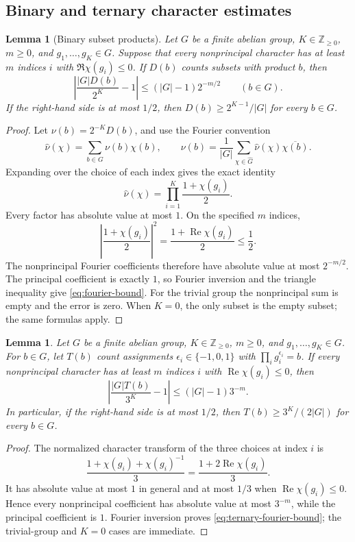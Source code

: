 \documentclass[11pt]{article}
\newtheorem{lemma}[theorem]{Lemma}
\theoremstyle{remark}\newtheorem{remark}[theorem]{Remark}
\begin{document}
\subsection{Binary and ternary character estimates}
\begin{lemma}[Binary subset products]\label{lem:binary}
Let $G$ be a finite abelian group, $K\in\mathbb Z_{\ge0}$, $m\ge0$,
and $g_1,\ldots,g_K\in G$. Suppose that every nonprincipal character
has at least $m$ indices $i$ with $\Re\chi(g_i)\le0$.
If $D(b)$ counts subsets with product $b$, then
\begin{equation}\label{eq:fourier-bound}
 \left|\frac{|G|D(b)}{2^K}-1\right|
 \le(|G|-1)2^{-m/2}\qquad(b\in G).
\end{equation}
If the right-hand side is at most $1/2$, then
$D(b)\ge2^{K-1}/|G|$ for every $b\in G$.
\end{lemma}
\begin{proof}
Let $\nu(b)=2^{-K}D(b)$, and use the Fourier convention
\[
 \widehat\nu(\chi)=\sum_{b\in G}\nu(b)\chi(b),\qquad
 \nu(b)=\frac1{|G|}\sum_{\chi\in\widehat G}
                \widehat\nu(\chi)\overline{\chi(b)}.
\]
Expanding over the choice of each index gives the exact identity
\[
 \widehat\nu(\chi)=\prod_{i=1}^K\frac{1+\chi(g_i)}2.
\]
Every factor has absolute value at most $1$. On the specified $m$ indices,
\[
 \left|\frac{1+\chi(g_i)}2\right|^2
     =\frac{1+\operatorname{Re}\chi(g_i)}2\le\frac12.
\]
The nonprincipal Fourier coefficients therefore have absolute value at
most $2^{-m/2}$. The principal coefficient is exactly $1$, so Fourier
inversion and the triangle inequality give \eqref{eq:fourier-bound}.
For the trivial group the nonprincipal sum is empty and the error is zero.
When $K=0$, the only subset is the empty subset; the same formulas apply.
\end{proof}

\begin{lemma}\label{lem:ternary}
Let $G$ be a finite abelian group, $K\in\mathbb Z_{\ge0}$, $m\ge0$, and
$g_1,\ldots,g_K\in G$. For $b\in G$, let $T(b)$ count assignments
$\epsilon_i\in\{-1,0,1\}$ with $\prod_i g_i^{\epsilon_i}=b$.
If every nonprincipal character has at least $m$ indices $i$ with
$\operatorname{Re}\chi(g_i)\le0$, then
\begin{equation}\label{eq:ternary-fourier-bound}
 \left|\frac{|G|T(b)}{3^K}-1\right|
 \le (|G|-1)3^{-m}.
\end{equation}
In particular, if the right-hand side is at most $1/2$, then
$T(b)\ge3^K/(2|G|)$ for every $b\in G$.
\end{lemma}
\begin{proof}
The normalized character transform of the three choices at index $i$ is
\[
 \frac{1+\chi(g_i)+\chi(g_i)^{-1}}3
 =\frac{1+2\operatorname{Re}\chi(g_i)}3.
\]
It has absolute value at most $1$ in general and at most $1/3$ when
$\operatorname{Re}\chi(g_i)\le0$. Hence every nonprincipal coefficient has absolute value
at most $3^{-m}$, while the principal coefficient is $1$. Fourier inversion
proves \eqref{eq:ternary-fourier-bound}; the trivial-group and $K=0$
cases are immediate.
\end{proof}
\end{document}
